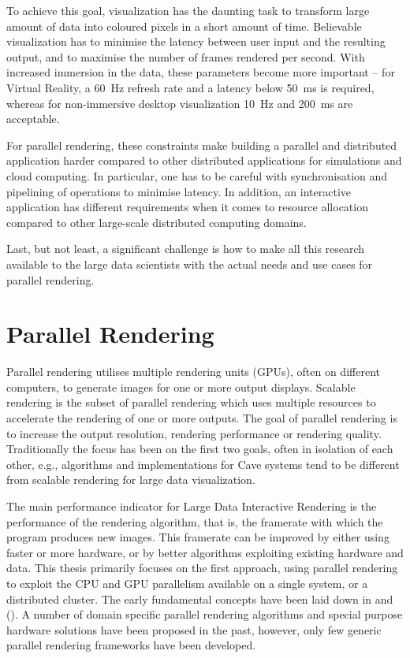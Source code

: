 To achieve this goal, visualization has the daunting task to transform large
amount of data into coloured pixels in a short amount of time. Believable
visualization has to minimise the latency between user input and the resulting
output, and to maximise the number of frames rendered per second. With
increased immersion in the data, these parameters become more important --
for Virtual Reality, a 60~Hz refresh rate and a latency below 50~ms is required,
whereas for non-immersive desktop visualization 10~Hz and 200~ms are acceptable.

For parallel rendering, these constraints make building a
parallel and distributed application harder compared to other distributed
applications for simulations and cloud computing. In particular, one has to be
careful with synchronisation and pipelining of operations to minimise latency.
In addition, an interactive application has different requirements when it
comes to resource allocation compared to other large-scale distributed
computing domains.

Last, but not least, a significant challenge is how to make all this research
available to the large data scientists with the actual needs and use cases for
parallel rendering.


\section{Parallel Rendering}

Parallel rendering utilises multiple rendering units (GPUs), often on
different computers, to generate images for one or more output displays.
Scalable rendering is the subset of parallel rendering which uses multiple
resources to accelerate the rendering of one or more outputs. The goal of
parallel rendering is to increase the output resolution, rendering performance
or rendering quality. Traditionally the focus has been on the first two goals,
often in isolation of each other, e.g., algorithms and implementations for Cave
systems tend to be different from scalable rendering for large data
visualization.

The main performance indicator for Large Data Interactive Rendering is the
performance of the rendering algorithm, that is, the framerate with which the
program produces new images. This framerate can be improved by either using
faster or more hardware, or by better algorithms exploiting existing
hardware and data. This thesis primarily focuses on the first approach, using
parallel rendering to exploit the CPU and GPU parallelism available on a single
system, or a distributed cluster. The early fundamental concepts have been laid
down in \cite{MCEF:94} and \cite{Crockett:97} (). A number of
domain specific parallel rendering algorithms and special purpose hardware
solutions have been proposed in the past, however, only few generic parallel
rendering frameworks have been developed.

